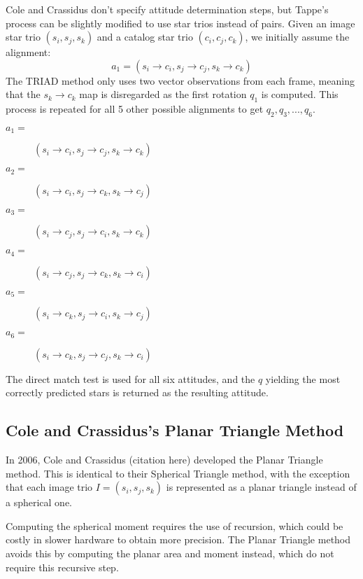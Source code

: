 Cole and Crassidus don't specify attitude determination steps, but Tappe's process can be slightly modified to use star trios instead of pairs. Given an image star trio $(s_i, s_j, s_k)$ and a catalog star trio $(c_i, c_j, c_k)$, we initially assume the alignment:
\begin{equation}
a_1 = (s_i \rightarrow c_i, s_j \rightarrow c_j, s_k \rightarrow c_k)
\end{equation}
The TRIAD method only uses two vector observations from each frame, meaning that the $s_k \rightarrow c_k$ map is disregarded as the first rotation $q_1$ is computed. This process is repeated for all 5 other possible alignments to get $q_2, q_3, ..., q_6$.
\begin{description}
\item [$a_1 = $] $(s_i \rightarrow c_i, s_j \rightarrow c_j, s_k \rightarrow c_k)$
\item [$a_2 = $] $(s_i \rightarrow c_i, s_j \rightarrow c_k, s_k \rightarrow c_j)$
\item [$a_3 = $] $(s_i \rightarrow c_j, s_j \rightarrow c_i, s_k \rightarrow c_k)$
\item [$a_4 = $] $(s_i \rightarrow c_j, s_j \rightarrow c_k, s_k \rightarrow c_i)$
\item [$a_5 = $] $(s_i \rightarrow c_k, s_j \rightarrow c_i, s_k \rightarrow c_j)$
\item [$a_6 = $] $(s_i \rightarrow c_k, s_j \rightarrow c_j, s_k \rightarrow c_i)$
\end{description}

The direct match test is used for all six attitudes, and the $q$ yielding the most correctly predicted stars is returned as the resulting attitude.

\subsection{Cole and Crassidus's Planar Triangle Method}
In 2006, Cole and Crassidus (citation here) developed the Planar Triangle method. This is identical to their Spherical Triangle method, with the exception that each image trio $I = (s_i, s_j, s_k)$ is represented as a planar triangle instead of a spherical one. 

Computing the spherical moment requires the use of recursion, which could be costly in slower hardware to obtain more precision. The Planar Triangle method avoids this by computing the planar area and moment instead, which do not require this recursive step.

